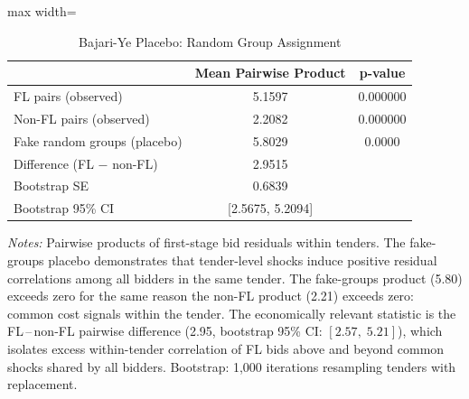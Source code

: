 \begin{table}[htbp]
\centering
\caption{Bajari-Ye Placebo: Random Group Assignment}
\label{tab:bajari_ye_placebo}
\begin{adjustbox}{max width=\textwidth}
\begin{threeparttable}
\small
\begin{tabular}{lcc}
\toprule
 & Mean Pairwise Product & p-value \\
\midrule
FL pairs (observed) & 5.1597 & 0.000000 \\
Non-FL pairs (observed) & 2.2082 & 0.000000 \\
Fake random groups (placebo) & 5.8029 & 0.0000 \\
\midrule
Difference (FL $-$ non-FL) & 2.9515 & \\
Bootstrap SE & 0.6839 & \\
Bootstrap 95\% CI & [2.5675, 5.2094] & \\
\bottomrule
\end{tabular}
\begin{tablenotes}
\small
\item \textit{Notes:} Pairwise products of first-stage bid residuals %
within tenders. The fake-groups placebo demonstrates that tender-level
shocks induce positive residual correlations among all bidders in the
same tender. The fake-groups product (5.80) exceeds zero for the same
reason the non-FL product (2.21) exceeds zero: common cost signals
within the tender. The economically relevant statistic is the
FL\,--\,non-FL pairwise difference (2.95, bootstrap 95\% CI:
$[2.57,\; 5.21]$), which isolates excess within-tender correlation
of FL bids above and beyond common shocks shared by all bidders.
Bootstrap: 1,000 iterations resampling tenders with replacement.
\end{tablenotes}
\end{threeparttable}
\end{adjustbox}
\end{table}
